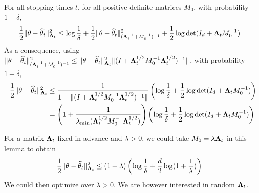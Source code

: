 \begin{lemma}\label{lem:concentration}
For all stopping times $t$, for all positive definite matrices $M_0$, with probability $1- \delta$,
\begin{align*}
\frac{1}{2} \Vert \theta - \widehat{\theta}_t \Vert^2_{{\boldsymbol \Lambda}_t}
&\le \log\frac{1}{\delta} + \frac{1}{2} \Vert \theta - \widehat{\theta}_t \Vert_{({\boldsymbol \Lambda}_t^{-1} + M_0^{-1})^{-1}}^2 + \frac{1}{2} \log \det (I_d + {\boldsymbol \Lambda}_t M_0^{-1})
\end{align*}
As a consequence, using $\Vert \theta - \widehat{\theta}_t \Vert_{({\boldsymbol \Lambda}_t^{-1} + M_0^{-1})^{-1}}^2 \le \Vert \theta - \widehat{\theta}_t \Vert_{{\boldsymbol \Lambda}_t}^2 \Vert (I + {\boldsymbol \Lambda}_t^{1/2} M_0^{-1}{\boldsymbol \Lambda}_t^{1/2})^{-1} \Vert$, with probability $1- \delta$,
\begin{align*}
\frac{1}{2} \Vert \theta - \widehat{\theta}_t \Vert^2_{{\boldsymbol \Lambda}_t}
&\le \frac{1}{1 - \Vert (I + {\boldsymbol \Lambda}_t^{1/2} M_0^{-1}{\boldsymbol \Lambda}_t^{1/2})^{-1} \Vert}\left( \log\frac{1}{\delta} + \frac{1}{2} \log \det (I_d + {\boldsymbol \Lambda}_t M_0^{-1})\right)
\\
&= \left( 1 + \frac{1}{\lambda_{\min} ({\boldsymbol \Lambda}_t^{1/2} M_0^{-1}{\boldsymbol \Lambda}_t^{1/2})}\right) \left( \log\frac{1}{\delta} + \frac{1}{2} \log \det (I_d + {\boldsymbol \Lambda}_t M_0^{-1})\right)
\end{align*}
\end{lemma}

For a matrix ${\boldsymbol \Lambda}_t$ fixed in advance and $\lambda>0$, we could take $M_0 = \lambda {\boldsymbol \Lambda}_t$ in this lemma to obtain
\begin{align*}
\frac{1}{2} \Vert \theta - \widehat{\theta}_t \Vert^2_{{\boldsymbol \Lambda}_t}
&\le (1+\lambda)\left(\log\frac{1}{\delta} + \frac{d}{2} \log (1 + \frac{1}{\lambda})\right)
\end{align*}
We could then optimize over $\lambda>0$. We are however interested in random ${\boldsymbol \Lambda}_t$.

